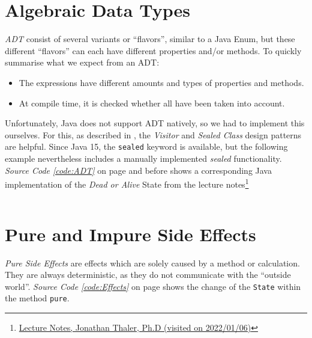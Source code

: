 \documentclass[a4paper,12pt,twoside]{scrreprt}
\begin{document}
\clearpage

\section{Algebraic Data Types}
\textit{\ac{ADT}} consist of several variants or \enquote{flavors}, similar to a Java Enum, but these different \enquote{flavors} can each have different properties and/or methods. To quickly summarise what we expect from an \ac{ADT}:
\begin{itemize}
    \item The expressions have different amounts and types of properties and methods.
    \item At compile time, it is checked whether all have been taken into account.
\end{itemize}

Unfortunately, Java does not support \ac{ADT} natively, so we had to implement this ourselves. For this, as described in \cite{MAINIERO_algebraic_2020}, the \textit{Visitor} and \textit{Sealed Class} design patterns are helpful. Since Java 15, the \texttt{sealed} keyword is available, but the following example nevertheless includes a manually implemented \textit{sealed} functionality. \textit{Source Code \ref{code:ADT}} on page \pageref{code:ADT} and before shows a corresponding Java implementation of the \textit{Dead or Alive} State from the lecture notes\footnote{\href{https://homepages.fhv.at/thjo/lecturenotes/concepts/declaring-types.html\#algebraic-data-types-1}{Lecture Notes, Jonathan Thaler, Ph.D (visited on 2022/01/06)}}

\inputminted[fontsize=\footnotesize,linenos,breaklines,breakanywhere]{java}{./code/AlgebraicDataTypes.java}

\begin{center}
\end{center}

\section{Pure and Impure Side Effects}
\textit{Pure Side Effects} are effects which are solely caused by a method or calculation. They are always deterministic, as they do not communicate with the \enquote{outside world}. \textit{Source Code \ref{code:Effects}} on page \pageref{code:Effects} shows the change of the \texttt{State} within the method \texttt{pure}.
\end{document}
